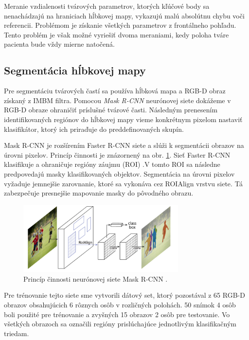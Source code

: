 Meranie vzdialenosti tvárových parametrov, ktorých kľúčové body sa nenachádzajú na hraniciach hĺbkovej mapy, vykazujú malú absolútnu chybu voči referencii. Problémom je získanie všetkých parametrov z frontálneho pohľadu. Tento problém je však možné vyriešiť dvoma meraniami, kedy poloha tváre pacienta bude vždy mierne natočená.

\subsection{Segmentácia hĺbkovej mapy}

Pre segmentáciu tvárových častí sa používa hĺbková mapa a RGB-D obraz získaný z IMBM filtra. Pomocou \textit{Mask R-CNN} neurónovej siete dokážeme v RGB-D obraze ohraničiť príslušné tvárové časti. Následným prenesením identifikovaných regiónov do hĺbkovej mapy vieme konkrétnym pixelom nastaviť klasifikátor, ktorý ich priraďuje do preddefinovaných skupín. 

Mask R-CNN je rozšírením Faster R-CNN siete a slúži k segmentácii obrazov na úrovni pixelov. Princíp činnosti je znázornený na obr. \ref{fig:mask_rcnn}. Sieť Faster R-CNN  klasifikuje a ohraničuje regióny záujmu (ROI) .V tomto ROI sa následne predpovedajú masky klasifikovaných objektov. Segmentácia na úrovni pixelov vyžaduje jemnejšie zarovnanie, ktoré sa vykonáva cez ROIAlign vrstvu siete. Tá zabezpečuje presnejšie mapovanie masky do pôvodného obrazu. 

\begin{figure}[H]
	\centering
	\includegraphics[width=0.75\textwidth]{figures/mask_rcnn.png}
	\caption{Princíp činnosti neurónovej siete Mask R-CNN .}
	\label{fig:mask_rcnn}
\end{figure}

Pre trénovanie tejto siete sme vytvorili dátový set, ktorý pozostával z 65 RGB-D obrazov obsahujúcich 6 rôznych osôb v rozličných polohách. 50 snímok 4 osôb boli použité pre trénovanie a zvyšných 15 obrazov 2 osôb pre testovanie. Vo všetkých obrazoch sa označili
regióny prislúchajúce jednotlivým klasifikačným triedam.\newpage

